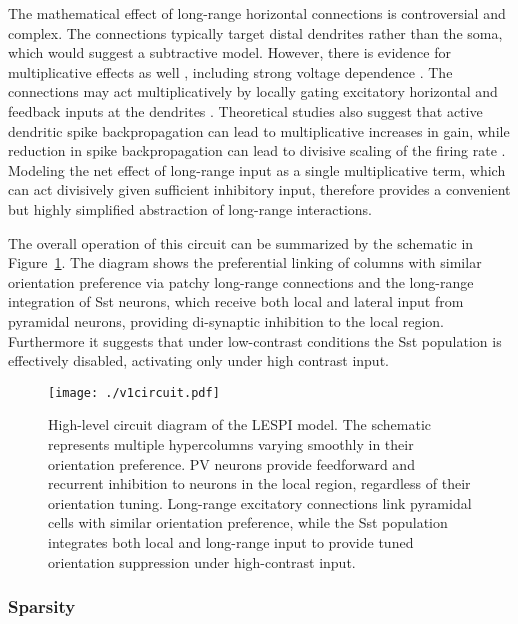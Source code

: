 The mathematical effect of long-range horizontal connections is
controversial and complex.  The connections typically target distal
dendrites rather than the soma, which would suggest a subtractive
model.  However, there is evidence for multiplicative effects as well
\citep{Wilson2012}, including strong voltage dependence
\citep{Hirsch1991}.  The connections may act multiplicatively by
locally gating excitatory horizontal and feedback inputs at the
dendrites \citep{Ma2011, Gentet2012}. Theoretical studies also suggest
that active dendritic spike backpropagation can lead to multiplicative
increases in gain, while reduction in spike backpropagation can lead
to divisive scaling of the firing rate \citep{Mehaffey2005}. Modeling
the net effect of long-range input as a single multiplicative term,
which can act divisively given sufficient inhibitory input, therefore
provides a convenient but highly simplified abstraction of long-range
interactions.

The overall operation of this circuit can be summarized by the
schematic in Figure~\ref{circuit_diagram}. The diagram shows the
preferential linking of columns with similar orientation preference
via patchy long-range connections and the long-range integration of
Sst neurons, which receive both local and lateral input from pyramidal
neurons, providing di-synaptic inhibition to the local
region. Furthermore it suggests that under low-contrast conditions the
Sst population is effectively disabled, activating only under high
contrast input.

\begin{figure}
	\centering
	\texttt{[image: ./v1circuit.pdf]}
	\caption[High-level circuit diagram of the LESPI
      model.]{High-level circuit diagram of the LESPI model. The
      schematic represents multiple hypercolumns varying smoothly in
      their orientation preference. PV neurons provide feedforward and
      recurrent inhibition to neurons in the local region,
      regardless of their orientation tuning. Long-range excitatory
      connections link pyramidal cells with similar orientation
      preference, while the Sst population integrates both local and
      long-range input to provide tuned orientation suppression under
      high-contrast input.}
    \label{circuit_diagram}
\end{figure}

\subsubsection*{Sparsity}

